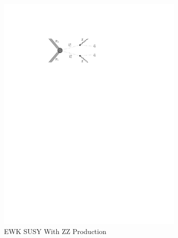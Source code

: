 \begin{figure}[!h]
\begin{subfigure}[b]{0.49\textwidth}
        \includegraphics[width=\textwidth]{figures/diagrams/TChiZZ.pdf}
        \caption{EWK SUSY With ZZ Production}
        \label{fig:tchizz_diagram_interpretations}
      \end{subfigure}
      \begin{subfigure}[b]{0.49\textwidth}

\end{subfigure}
\end{figure}
